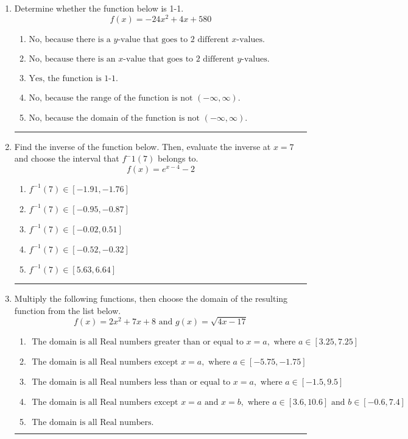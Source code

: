 \documentclass[14pt]{extbook}
\newcommand{\litem}[1]{\item#1\hspace*{-1cm}\rule{\textwidth}{0.4pt}}
\begin{document}
\begin{enumerate}
{\begin{enumerate}[label=\Alph*.]
\end{enumerate} }
\litem{
Determine whether the function below is 1-1.\[ f(x) = -24 x^2 + 4 x + 580 \]\begin{enumerate}[label=\Alph*.]
\item \( \text{No, because there is a $y$-value that goes to 2 different $x$-values.} \)
\item \( \text{No, because there is an $x$-value that goes to 2 different $y$-values.} \)
\item \( \text{Yes, the function is 1-1.} \)
\item \( \text{No, because the range of the function is not $(-\infty, \infty)$.} \)
\item \( \text{No, because the domain of the function is not $(-\infty, \infty)$.} \)

\end{enumerate} }
\litem{
Find the inverse of the function below. Then, evaluate the inverse at $x = 7$ and choose the interval that $f^-1(7)$ belongs to.\[ f(x) = e^{x-4}-2 \]\begin{enumerate}[label=\Alph*.]
\item \( f^{-1}(7) \in [-1.91, -1.76] \)
\item \( f^{-1}(7) \in [-0.95, -0.87] \)
\item \( f^{-1}(7) \in [-0.02, 0.51] \)
\item \( f^{-1}(7) \in [-0.52, -0.32] \)
\item \( f^{-1}(7) \in [5.63, 6.64] \)

\end{enumerate} }
\litem{
Multiply the following functions, then choose the domain of the resulting function from the list below.\[ f(x) = 2x^{2} +7 x + 8 \text{ and } g(x) = \sqrt{4x-17}  \]\begin{enumerate}[label=\Alph*.]
\item \( \text{ The domain is all Real numbers greater than or equal to } x = a, \text{ where } a \in [3.25, 7.25] \)
\item \( \text{ The domain is all Real numbers except } x = a, \text{ where } a \in [-5.75, -1.75] \)
\item \( \text{ The domain is all Real numbers less than or equal to } x = a, \text{ where } a \in [-1.5, 9.5] \)
\item \( \text{ The domain is all Real numbers except } x = a \text{ and } x = b, \text{ where } a \in [3.6, 10.6] \text{ and } b \in [-0.6, 7.4] \)
\item \( \text{ The domain is all Real numbers. } \)


\end{enumerate}}
\end{enumerate}
\end{document}
